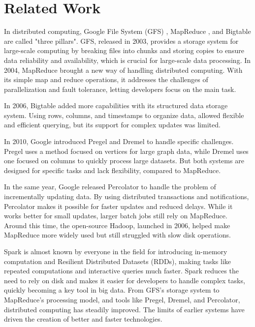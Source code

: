 \section{Related Work}
\label{sec:relatedwork}

In distributed computing, Google File System (GFS) \cite{ghemawat2003google}, MapReduce \cite{dean2008mapreduce}, and Bigtable \cite{chang2008bigtable} are called "three pillars". GFS, released in 2003, provides a storage system for large-scale computing by breaking files into chunks and storing copies to ensure data reliability and availability, which is crucial for large-scale data processing. In 2004, MapReduce brought a new way of handling distributed computing. With its simple map and reduce operations, it addresses the challenges of parallelization and fault tolerance, letting developers focus on the main task. 

In 2006, Bigtable \cite{chang2008bigtable} added more capabilities with its structured data storage system. Using rows, columns, and timestamps to organize data, allowed flexible and efficient querying, but its support for complex updates was limited.

In 2010, Google introduced Pregel \cite{malewicz2010pregel} and Dremel \cite{melnik2010dremel} to handle specific challenges. Pregel uses a method focused on vertices for large graph data, while Dremel uses one focused on columns to quickly process large datasets. But both systems are designed for specific tasks and lack flexibility, compared to MapReduce.

In the same year, Google released Percolator to handle the problem of incrementally updating data. By using distributed transactions and notifications, Percolator makes it possible for faster updates and reduced delays. While it works better for small updates, larger batch jobs still rely on MapReduce. Around this time, the open-source Hadoop, launched in 2006, helped make MapReduce more widely used but still struggled with slow disk operations.

Spark \cite{zaharia2016apache} is almost known by everyone in the field for introducing in-memory computation and Resilient Distributed Datasets (RDDs), making tasks like repeated computations and interactive queries much faster. Spark reduces the need to rely on disk and makes it easier for developers to handle complex tasks, quickly becoming a key tool in big data. From GFS’s storage system to MapReduce’s processing model, and tools like Pregel, Dremel, and Percolator, distributed computing has steadily improved. The limits of earlier systems have driven the creation of better and faster technologies.